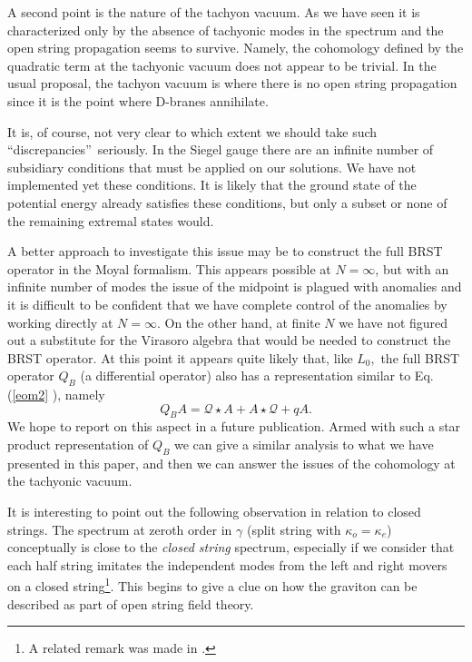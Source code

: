 \documentclass[a4paper,aps,preprint,nofootinbib,eqsecnum]{revtex4}
\begin{document}
A second point is the nature of the tachyon vacuum. As we have seen it is
characterized only by the absence of tachyonic modes in the spectrum and the
open string propagation seems to survive. Namely, the cohomology defined by
the quadratic term at the tachyonic vacuum does not appear to be trivial. In
the usual proposal, the tachyon vacuum is where there is no open string
propagation since it is the point where D-branes annihilate.

It is, of course, not very clear to which extent we should take such
\textquotedblleft discrepancies\textquotedblright\ seriously. In the Siegel
gauge there are an infinite number of subsidiary conditions that must be
applied on our solutions. We have not implemented yet these conditions. It
is likely that the ground state of the potential energy already satisfies
these conditions, but only a subset or none of the remaining extremal states
would.

A better approach to investigate this issue may be to construct the full
BRST operator in the Moyal formalism. This appears possible at $N=\infty $,
but with an infinite number of modes the issue of the midpoint is plagued
with anomalies and it is difficult to be confident that we have complete
control of the anomalies by working directly at $N=\infty .$ On the other
hand, at finite $N$ we have not figured out a substitute for the Virasoro
algebra that would be needed to construct the BRST operator. At this point
it appears quite likely that, like $L_{0},$ the full BRST operator $Q_{B}$
(a differential operator) also has a representation similar to Eq.(\ref{eom2}%
), namely%
\begin{equation}
Q_{B}A=\mathcal{Q}\star A+A\star \mathcal{Q}+qA.
\end{equation}%
We hope to report on this aspect in a future publication. Armed with such a
star product representation of $Q_{B}$ we can give a similar analysis to
what we have presented in this paper, and then we can answer the issues of
the cohomology at the tachyonic vacuum.

It is interesting to point out the following observation in relation to
closed strings. The spectrum at zeroth order in $\gamma $ (split string with
$\kappa _{o}=\kappa _{e}$) conceptually is close to the \emph{closed string}
spectrum, especially if we consider that each half string imitates the
independent modes from the left and right movers on a closed string\footnote{%
A related remark was made in \cite{Moore-Taylor}.}. This begins to give a
clue on how the graviton can be described as part of open string field
theory.
\end{document}
